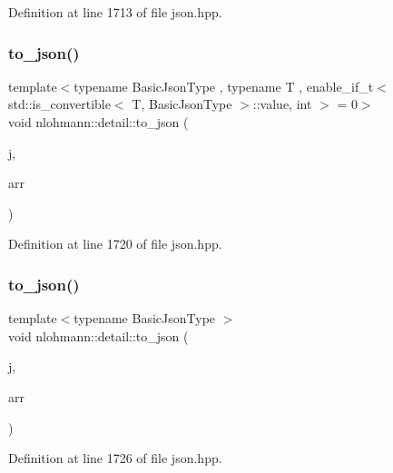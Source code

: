 Definition at line 1713 of file json.\+hpp.

\mbox{\label{namespacenlohmann_1_1detail_a7f7c7b9760161b774cdc0b4b838fae64}} 
\subsubsection{\texorpdfstring{to\+\_\+json()}{to\_json()}\hspace{0.1cm}{\footnotesize\ttfamily [10/16]}}
{\footnotesize\ttfamily template$<$typename Basic\+Json\+Type , typename T , enable\+\_\+if\+\_\+t$<$ std\+::is\+\_\+convertible$<$ T, Basic\+Json\+Type $>$\+::value, int $>$  = 0$>$ \\
void nlohmann\+::detail\+::to\+\_\+json (\begin{DoxyParamCaption}\item[{Basic\+Json\+Type \&}]{j,  }\item[{const std\+::valarray$<$ T $>$ \&}]{arr }\end{DoxyParamCaption})}



Definition at line 1720 of file json.\+hpp.

\mbox{\label{namespacenlohmann_1_1detail_aa0fd1b5788e9ba37e31da43dda738cb5}} 
\subsubsection{\texorpdfstring{to\+\_\+json()}{to\_json()}\hspace{0.1cm}{\footnotesize\ttfamily [11/16]}}
{\footnotesize\ttfamily template$<$typename Basic\+Json\+Type $>$ \\
void nlohmann\+::detail\+::to\+\_\+json (\begin{DoxyParamCaption}\item[{Basic\+Json\+Type \&}]{j,  }\item[{typename Basic\+Json\+Type\+::array\+\_\+t \&\&}]{arr }\end{DoxyParamCaption})}



Definition at line 1726 of file json.\+hpp.

